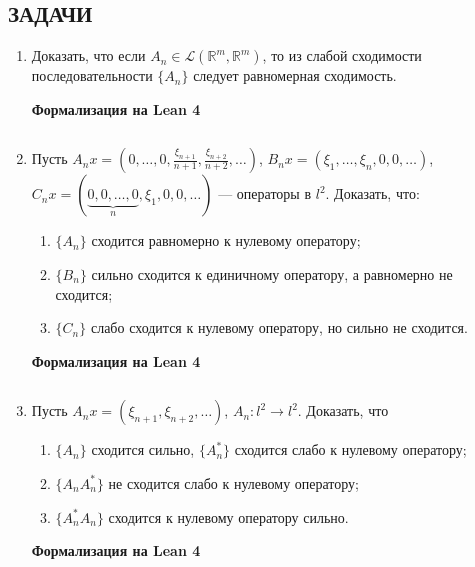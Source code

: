 \documentclass[12pt,a4paper]{article}
\begin{document}
\subsection*{ЗАДАЧИ}
\begin{enumerate}
\newpage
\item Доказать, что если $A_{n} \in \mathcal{L}(\mathbb{R}^{m},\mathbb{R}^{m})$, то из слабой сходимости последовательности $\{A_{n}\}$ следует равномерная сходимость.


\begin{center}\small\textbf{Формализация на Lean 4}\end{center}
\inputminted{lean}{FunAn/Section19_OperatorConvergence/Task01.lean}

\newpage

\item Пусть $A_{n}x = (0, \dots, 0, \frac{\xi_{n+1}}{n+1}, \frac{\xi_{n+2}}{n+2}, \dots)$, $B_{n}x = (\xi_{1}, \dots, \xi_{n}, 0, 0, \dots)$, $C_{n}x = (\underbrace{0, 0, \dots, 0}_{n}, \xi_{1}, 0, 0, \dots)$ — операторы в $l^{2}$. Доказать, что:
\begin{enumerate}[label=\alph*)]
\item $\{A_{n}\}$ сходится равномерно к нулевому оператору;
\item $\{B_{n}\}$ сильно сходится к единичному оператору, а равномерно не сходится;
\item $\{C_{n}\}$ слабо сходится к нулевому оператору, но сильно не сходится.
\end{enumerate}


\begin{center}\small\textbf{Формализация на Lean 4}\end{center}
\inputminted{lean}{FunAn/Section19_OperatorConvergence/Task02.lean}

\newpage

\item Пусть $A_{n}x = (\xi_{n+1}, \xi_{n+2}, \dots)$, $A_{n}: l^{2} \rightarrow l^{2}$. Доказать, что
\begin{enumerate}[label=\alph*)]
\item $\{A_{n}\}$ сходится сильно, $\{A_{n}^{*}\}$ сходится слабо к нулевому оператору;
\item $\{A_{n}A_{n}^{*}\}$ не сходится слабо к нулевому оператору;
\item $\{A_{n}^{*}A_{n}\}$ сходится к нулевому оператору сильно.
\end{enumerate}


\begin{center}\small\textbf{Формализация на Lean 4}\end{center}
\inputminted{lean}{FunAn/Section19_OperatorConvergence/Task03.lean}


\end{enumerate}
\end{document}
